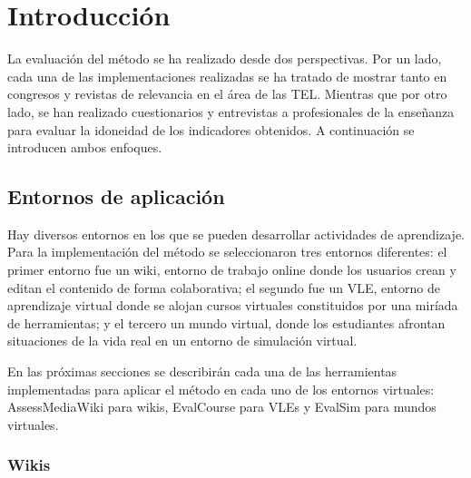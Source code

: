 \section{Introducción}

La evaluación del método se ha realizado desde dos perspectivas. Por un lado, cada una de las implementaciones realizadas se ha tratado de mostrar tanto en congresos y revistas de relevancia en el área de las TEL. Mientras que por otro lado, se han realizado cuestionarios y entrevistas a profesionales de la enseñanza para evaluar la idoneidad de los indicadores obtenidos. A continuación se introducen ambos enfoques.



\subsection{Entornos de aplicación}
\label{sec:tools}

Hay diversos entornos en los que se pueden desarrollar actividades de aprendizaje. Para la implementación del método se seleccionaron tres entornos diferentes: el primer entorno fue un wiki, entorno de trabajo online donde los usuarios crean y editan el contenido de forma colaborativa; el segundo fue un VLE, entorno de aprendizaje virtual donde se alojan cursos virtuales constituidos por una miríada de herramientas; y el tercero un mundo virtual, donde los estudiantes afrontan situaciones de la vida real en un entorno de simulación virtual.

En las próximas secciones se describirán cada una de las herramientas implementadas para aplicar el método en cada uno de los entornos virtuales: AssessMediaWiki para wikis, EvalCourse para VLEs y EvalSim para mundos virtuales.

\subsubsection{Wikis}

